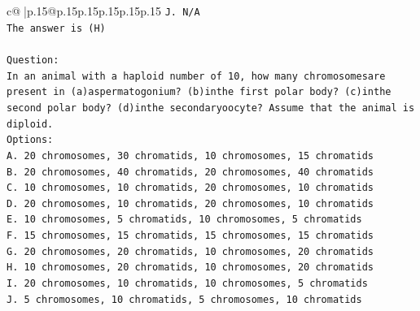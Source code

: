\documentclass{article}
\begin{document}
{\begin{supertabular}{c@{$\;$}|p{.15\linewidth}@{}p{.15\linewidth}p{.15\linewidth}p{.15\linewidth}p{.15\linewidth}p{.15\linewidth}}
{{{\texttt{J. N/A} \\
\texttt{The answer is (H)} \\
\\ 
\texttt{Question:} \\
\texttt{In an animal with a haploid number of 10, how many chromosomesare present in (a)aspermatogonium? (b)inthe first polar body? (c)inthe second polar body? (d)inthe secondaryoocyte? Assume that the animal is diploid.} \\
\texttt{Options:} \\
\texttt{A. 20 chromosomes, 30 chromatids, 10 chromosomes, 15 chromatids} \\
\texttt{B. 20 chromosomes, 40 chromatids, 20 chromosomes, 40 chromatids} \\
\texttt{C. 10 chromosomes, 10 chromatids, 20 chromosomes, 10 chromatids} \\
\texttt{D. 20 chromosomes, 10 chromatids, 20 chromosomes, 10 chromatids} \\
\texttt{E. 10 chromosomes, 5 chromatids, 10 chromosomes, 5 chromatids} \\
\texttt{F. 15 chromosomes, 15 chromatids, 15 chromosomes, 15 chromatids} \\
\texttt{G. 20 chromosomes, 20 chromatids, 10 chromosomes, 20 chromatids} \\
\texttt{H. 10 chromosomes, 20 chromatids, 10 chromosomes, 20 chromatids} \\
\texttt{I. 20 chromosomes, 10 chromatids, 10 chromosomes, 5 chromatids} \\
\texttt{J. 5 chromosomes, 10 chromatids, 5 chromosomes, 10 chromatids} \\
            }
        }
    }
     \\ \\


\end{supertabular}}
\end{document}
